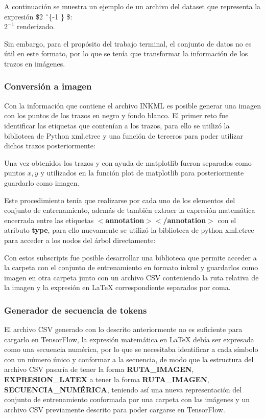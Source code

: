 A continuación se muestra un ejemplo de un archivo del dataset que representa la expresión \$2 \^\ \{-1 \} \$:\\
 $2^{-1}$ renderizado.

Sin embargo, para el propósito del trabajo terminal, el conjunto de datos no es útil en este formato, por lo que se tenía que transformar la información de los trazos en imágenes.
\subsubsection{Conversión a imagen}
Con la información que contiene el archivo INKML es posible generar una imagen con los puntos de los trazos en negro y fondo blanco. El primer reto fue identificar las etiquetas que contenían a los trazos, para ello se utilizó la biblioteca de Python xml.etree y una función de terceros para poder utilizar dichos trazos posteriormente:



Una vez obtenidos los trazos y con ayuda de matplotlib fueron separados como puntos $x,y$ y utilizados en la función plot de matplotlib para posteriormente guardarlo como imagen.



Este procedimiento tenía que realizarse por cada uno de los elementos del conjunto de entrenamiento, además de también extraer la expresión matemática encerrada entre las etiquetas \textbf{$<$annotation$>$$<$/annotation$>$} con el atributo \textbf{type}, para ello nuevamente se utilizó la biblioteca de python xml.etree para acceder a los nodos del árbol directamente:

Con estos subscripts fue posible desarrollar una biblioteca que permite acceder a la carpeta con el conjunto de entrenamiento en formato inkml y guardarlos como imagen en otra carpeta junto con un archivo CSV conteniendo la ruta relativa de la imagen y la expresión en \LaTeX{} correspondiente separados por coma.


\subsubsection{Generador de secuencia de tokens}
El archivo CSV generado con lo descrito anteriormente no es suficiente para cargarlo en TensorFlow, la expresión matemática en \LaTeX{} debía ser expresada como una secuencia numérica, por lo que se necesitaba identificar a cada símbolo con un número único y conformar a la secuencia, de modo que la estructura del archivo CSV pasaría de tener la forma \textbf{RUTA\_IMAGEN}, \textbf{EXPRESION\_LATEX} a tener la forma \textbf{RUTA\_IMAGEN}, \textbf{SECUENCIA\_NUMÉRICA}, teniendo así una nueva representación del conjunto de entrenamiento conformada por una carpeta con las imágenes y un archivo CSV previamente descrito para poder cargarse en TensorFlow.

